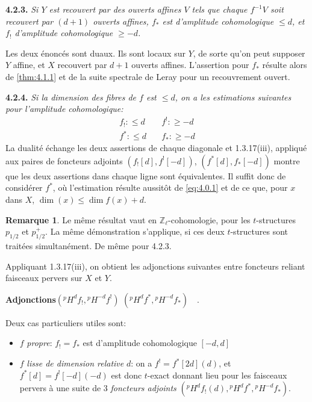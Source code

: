 \documentclass[12pt,a4paper]{article}
\theoremstyle{plain}
\theoremstyle{definition}
\newtheorem{remark}[theorem]{Remarque}
\begin{document}
\noindent\textbf{4.2.3.} \emph{Si $Y$ est recouvert par des ouverts affines $V$ tels que chaque $f^{-1}V$ soit recouvert par $(d+1)$ ouverts affines, $f_{*}$ est d'amplitude cohomologique $\leq d$, et $f_{!}$ d'amplitude cohomologique $\geq -d$.}

Les deux \'{e}nonc\'{e}s sont duaux. Ils sont locaux sur $Y$, de sorte qu'on peut supposer $Y$ affine, et $X$ recouvert par $d+1$ ouverts affines. L'assertion pour $f_{*}$ r\'{e}sulte alors de \ref{thm:4.1.1} et de la suite spectrale de Leray pour un recouvrement ouvert.

\noindent\textbf{4.2.4.} \emph{Si la dimension des fibres de $f$ est $\leq d$, on a les estimations suivantes pour l'amplitude cohomologique:}
\[
\begin{array}{ll}
f_{!}: \leq d & \quad f^{!}: \geq -d \\
f^{*}: \leq d & \quad f_{*}: \geq -d
\end{array}
\]
La dualit\'{e} \'{e}change les deux assertions de chaque diagonale et 1.3.17(iii), appliqu\'{e} aux paires de foncteurs adjoints $(f_{!}[d], f^{!}[-d])$, $(f^{*}[d], f_{*}[-d])$ montre que les deux assertions dans chaque ligne sont \'{e}quivalentes. Il suffit donc de consid\'{e}rer $f^{*}$, o\`{u} l'estimation r\'{e}sulte aussit\^{o}t de \eqref{eq:4.0.1} et de ce que, pour $x$ dans $X$, $\dim(x) \leq \dim f(x) + d$.

\begin{remark}
Le m\^{e}me r\'{e}sultat vaut en $\mathbb{Z}_{\ell}$-cohomologie, pour les $t$-structures $p_{1/2}$ et $p_{1/2}^{+}$. La m\^{e}me d\'{e}monstration s'applique, si ces deux $t$-structures sont trait\'{e}es simultan\'{e}ment. De m\^{e}me pour 4.2.3.
\end{remark}

Appliquant 1.3.17(iii), on obtient les adjonctions suivantes entre foncteurs reliant faisceaux pervers sur $X$ et $Y$.
\begin{center}
\textbf{Adjonctions}\qquad $({}^{p}H^{d}f_{!}, {}^{p}H^{-d}f^{!})$ \quad {} \quad $({}^{p}H^{d}f^{*}, {}^{p}H^{-d}f_{*})\quad.$
\end{center}
Deux cas particuliers utiles sont:
\begin{itemize}
\item $f$ \emph{propre}: $f_{!} = f_{*}$ est d'amplitude cohomologique $[-d,d]$
\item $f$ \emph{lisse de dimension relative} $d$: on a $f^{!} = f^{*}[2d](d)$, et $f^{*}[d] = f^{!}[-d](-d)$ est donc $t$-exact donnant lieu pour les faisceaux pervers \`{a} une suite de 3 \emph{foncteurs adjoints} $({}^{p}H^{d}f_{!}(d), {}^{p}H^{d}f^{*}, {}^{p}H^{-d}f_{*})$.
\end{itemize}
\end{document}
